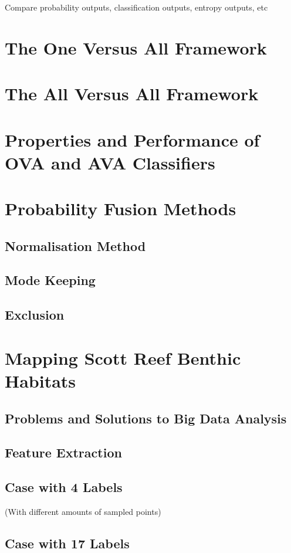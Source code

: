		Compare probability outputs, classification outputs, entropy outputs, etc

	\section{The One Versus All Framework}
	
	\section{The All Versus All Framework}
	
	\section{Properties and Performance of OVA and AVA Classifiers}
	
	\section{Probability Fusion Methods}
	
		\subsection{Normalisation Method}
			
		\subsection{Mode Keeping}
			
		\subsection{Exclusion}
			
	\section{Mapping Scott Reef Benthic Habitats}
	\label{BenthicHabitatMapping:ScottReef}
	
		\subsection{Problems and Solutions to Big Data Analysis}
		
		\subsection{Feature Extraction}
		
		\subsection{Case with 4 Labels}
		
			(With different amounts of sampled points)
			
		\subsection{Case with 17 Labels}
		